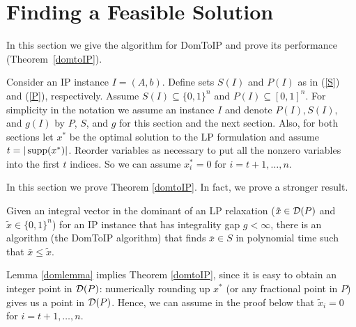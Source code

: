 \section{Finding a Feasible Solution}\label{sec:domTOIP}
In this section we give the algorithm for DomToIP and prove its performance (Theorem~\ref{domtoIP}).

Consider an IP instance $I=(A,b)$. Define sets $S(I)$ and $P(I)$ as in (\ref{S}) and (\ref{P}), respectively. Assume $S(I)\subseteq \{0,1\}^n$ and $P(I)\subseteq [0,1]^n$. For simplicity in the notation we assume an instance $I$ and denote $P(I),S(I),$ and $g(I)$ by $P$, $S$, and $g$ for this section and the next section. Also, for both sections let $x^*$ be the optimal solution to the LP formulation and assume $t=|\operatorname{supp}(x^*)|$. Reorder variables as necessary to put all the nonzero variables into the first $t$ indices. So we can assume $x^*_i = 0$ for $i=t+1,\ldots,n$.

In this section we prove Theorem \ref{domtoIP}. In fact, we prove a stronger result. 
\begin{lemma}\label{domlemma}
	Given an integral vector in the dominant of an LP relaxation ($\tilde{x}\in \operatorname{\mathcal{D}}(P)$ and $\tilde{x}\in \{0,1\}^n$) for an IP instance that has integrality gap $g < \infty$, there is an algorithm (the DomToIP algorithm) that finds $\bar{x}\in S$ in polynomial time such that $\bar{x}\leq \tilde{x}$.\end{lemma}
Lemma \ref{domlemma} implies Theorem \ref{domtoIP}, since it is easy to obtain an integer point in $\operatorname{\mathcal{D}}(P)$: numerically rounding up $x^*$ (or any fractional point in $P$) gives us a point in $\operatorname{\mathcal{D}}(P)$.
Hence, we can assume in the proof below that $\tilde{x}_i= 0$ for $i=t+1,\ldots,n$. 
